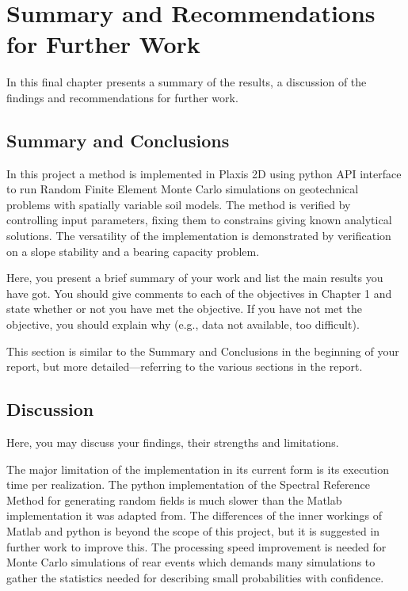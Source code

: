 \chapter[Summary]{Summary and Recommendations for Further Work}

In this final chapter presents a summary of the results, a discussion of the findings and recommendations for further work.

\section{Summary and Conclusions}
In this project a method is implemented in Plaxis 2D using python API interface to run Random Finite Element Monte Carlo simulations on geotechnical problems with spatially variable soil models.
The method is verified by controlling input parameters, fixing them to constrains giving known analytical solutions. 
The versatility of the implementation is demonstrated by verification on a slope stability and a bearing capacity problem. 


Here, you present a brief summary of your work and list the main results you have got. You should give comments to each of the objectives in Chapter 1 and state whether or not you have met the objective. If you have not met the objective, you should explain why (e.g., data not available, too difficult).

This section is similar to the Summary and Conclusions in the beginning of your report, but more detailed---referring to the various sections in the report.

\section{Discussion}
Here, you may discuss your findings, their strengths and limitations.

The major limitation of the implementation in its current form is its execution time per realization. The python implementation of the Spectral Reference Method for generating random fields is much slower than the Matlab implementation it was adapted from. The differences of the inner workings of Matlab and python is beyond the scope of this project, but it is suggested in further work to improve this. The processing speed improvement is needed for Monte Carlo simulations of rear events which demands many simulations to gather the statistics needed for describing small probabilities with confidence. 

